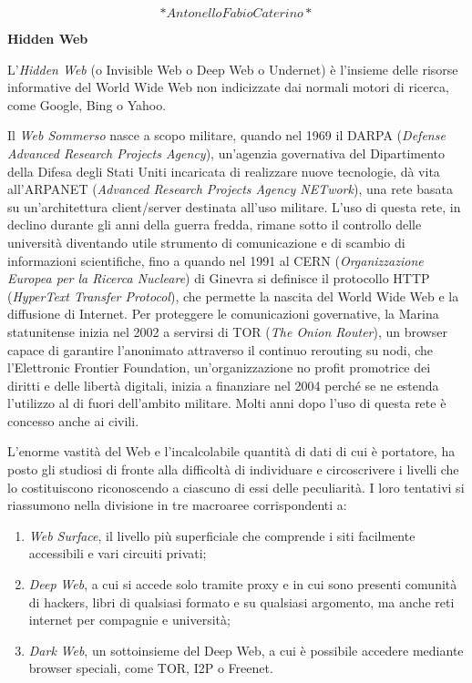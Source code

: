 \documentclass[
  b5paper,
  twoside,
  11pt,
  chapterprefix=false,
  bibliography=totocnumbered,
  listof=flat]{scrbook}
\begin{document}
\[*Antonello Fabio Caterino*\]

\textbf{Hidden Web}

L'\emph{Hidden Web} (o Invisible Web o Deep Web o Undernet) è l'insieme delle
risorse informative del World Wide Web non indicizzate dai normali
motori di ricerca, come Google, Bing o Yahoo.

Il \emph{Web Sommerso} nasce a scopo militare, quando nel 1969 il DARPA
(\emph{Defense Advanced Research Projects Agency}), un'agenzia governativa
del Dipartimento della Difesa degli Stati Uniti incaricata di realizzare
nuove tecnologie, dà vita all'ARPANET (\emph{Advanced Research Projects
Agency NETwork}), una rete basata su un'architettura client/server
destinata all'uso militare. L'uso di questa rete, in declino durante gli
anni della guerra fredda, rimane sotto il controllo delle università
diventando utile strumento di comunicazione e di scambio di informazioni
scientifiche, fino a quando nel 1991 al CERN (\emph{Organizzazione Europea
per la Ricerca Nucleare}) di Ginevra si definisce il protocollo HTTP
(\emph{HyperText Transfer Protocol}), che permette la nascita del World Wide
Web e la diffusione di Internet. Per proteggere le comunicazioni
governative, la Marina statunitense inizia nel 2002 a servirsi di TOR
(\emph{The Onion Router}), un browser capace di garantire l'anonimato
attraverso il continuo rerouting su nodi, che l'Elettronic Frontier
Foundation, un'organizzazione no profit promotrice dei diritti e delle
libertà digitali, inizia a finanziare nel 2004 perché se ne estenda
l'utilizzo al di fuori dell'ambito militare. Molti anni dopo l'uso di
questa rete è concesso anche ai civili.

L'enorme vastità del Web e l'incalcolabile quantità di dati di cui è
portatore, ha posto gli studiosi di fronte alla difficoltà di
individuare e circoscrivere i livelli che lo costituiscono riconoscendo
a ciascuno di essi delle peculiarità. I loro tentativi si riassumono
nella divisione in tre macroaree corrispondenti a:

\begin{enumerate}
\def\labelenumi{\arabic{enumi}.}
\item
  \emph{Web Surface}, il livello più superficiale che comprende i siti
  facilmente accessibili e vari circuiti privati;
\item
  \emph{Deep} \emph{Web}, a cui si accede solo tramite proxy e in cui sono
  presenti comunità di hackers, libri di qualsiasi formato e su
  qualsiasi argomento, ma anche reti internet per compagnie e
  università;
\item
  \emph{Dark} \emph{Web}, un sottoinsieme del Deep Web, a cui è possibile
  accedere mediante browser speciali, come TOR, I2P o Freenet.
\end{enumerate}
\end{document}

